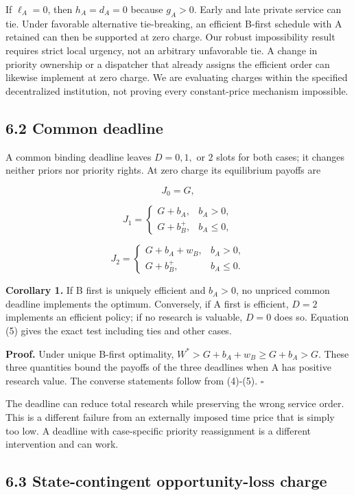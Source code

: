 \documentclass[
  11pt,
]{article}
\begin{document}
If \(\ell_A=0\), then \(h_A=d_A=0\) because \(g_A>0\). Early and late
private service can tie. Under favorable alternative tie-breaking, an
efficient B-first schedule with A retained can then be supported at zero
charge. Our robust impossibility result requires strict local urgency,
not an arbitrary unfavorable tie. A change in priority ownership or a
dispatcher that already assigns the efficient order can likewise
implement at zero charge. We are evaluating charges within the specified
decentralized institution, not proving every constant-price mechanism
impossible.

\subsection{6.2 Common deadline}\label{common-deadline}

A common binding deadline leaves \(D=0,1,\) or \(2\) slots for both
cases; it changes neither priors nor priority rights. At zero charge its
equilibrium payoffs are

\[J_0=G,\]

\[J_1=\begin{cases}G+b_A,&b_A>0,\\G+b_B^+,&b_A\leq0,\end{cases}\]

\[J_2=\begin{cases}G+b_A+w_B,&b_A>0,\\G+b_B^+,&b_A\leq0.\end{cases} \tag{5}\]

\textbf{Corollary 1.} If B first is uniquely efficient and \(b_A>0\), no
unpriced common deadline implements the optimum. Conversely, if A first
is efficient, \(D=2\) implements an efficient policy; if no research is
valuable, \(D=0\) does so. Equation (5) gives the exact test including
ties and other cases.

\textbf{Proof.} Under unique B-first optimality,
\(W^*>G+b_A+w_B\geq G+b_A>G\). These three quantities bound the payoffs
of the three deadlines when A has positive research value. The converse
statements follow from (4)-(5). \(\square\)

The deadline can reduce total research while preserving the wrong
service order. This is a different failure from an externally imposed
time price that is simply too low. A deadline with case-specific
priority reassignment is a different intervention and can work.

\subsection{6.3 State-contingent opportunity-loss
charge}\label{state-contingent-opportunity-loss-charge}
\end{document}
